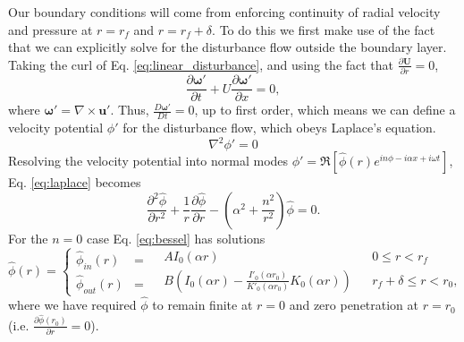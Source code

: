 \documentclass[superscriptaddress, onecolumn, prl]{revtex4}
\begin{document}
Our boundary conditions will come from enforcing continuity of radial velocity and pressure at $r=r_f$ and $r=r_f+\delta$. To do this we first make use of the fact that we can explicitly solve for the disturbance flow outside the boundary layer. Taking the curl of Eq. \ref{eq:linear_disturbance}, and using the fact that $\frac{\partial \textbf{U}}{\partial r} = 0$, 
\begin{equation}
\frac{\partial \boldsymbol{\omega}'}{\partial t} + U \frac{\partial \boldsymbol{\omega}'}{\partial x} = 0,
\end{equation}
where $\boldsymbol{\omega}' = \nabla \times \boldsymbol{u}'$. Thus, $\frac{D \boldsymbol{\omega}'}{Dt}=0$, up to first order, which means we can define a velocity potential $\phi'$ for the disturbance flow, which obeys Laplace's equation.
\begin{equation}
\label{eq:laplace}
\nabla^2 \phi' = 0 
\end{equation}
Resolving the velocity potential into normal modes $\phi'= \Re \left[ \hat{\phi}(r) e^{in\phi - i \alpha x + i \omega t} \right]$, Eq. \ref{eq:laplace} becomes 
\begin{equation}
\label{eq:bessel}
\frac{\partial^2 \hat{\phi}}{\partial r^2}+\frac{1}{r}\frac{\partial \hat{\phi}}{\partial r} - \left( \alpha^2 + \frac{n^2}{r^2} \right) \hat{\phi} = 0.
\end{equation}
For the $n=0$ case Eq. \ref{eq:bessel} has solutions
\begin{equation}
\label{eq:phi1}
\hat{\phi}(r) =\begin{cases}
\hat{\phi}_{in}(r) &= \\ 
\hat{\phi}_{out}(r) &= 
\end{cases}
\begin{aligned}
& A I_0(\alpha r) && 0 \leq r < r_f \\
& B \left(I_0(\alpha r) - \frac{I'_0(\alpha r_0)}{K'_0(\alpha r_0)}K_0(\alpha r)  \right) && r_f + \delta \leq r < r_0,
\end{aligned}
\end{equation}
where we have required $\hat{\phi}$ to remain finite at $r=0$ and zero penetration at $r=r_0$ (i.e. $\frac{\partial \hat{\phi}(r_0)}{\partial r}=0$). 
\end{document}
